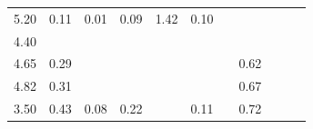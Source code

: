 \documentclass[10pt,a4paper]{article}
\begin{document}
\begin{table}
\begin{tabular}{@{}ccccccccccc@{}}
		5.20                                                         & 0.11                                                & 0.01                                                & 0.09                                                & 1.42                                                & 0.10                                                 &                                                     &                                                       &                                                         &                                                      & \cite{Walsh}         \\
		4.40                                                         &                                                     &                                                     &                                                     &                                                     &                                                      &                                                     &                                                       &                                                         &                                                      & \cite{Zheng}                                 \\
		4.65                                                         & 0.29                                                &                                                     &                                                     &                                                     &                                                      &                                                     & 0.62                                                  &                                                         &                                                      & \cite{Sorensen}                                           \\
		4.82                                                         & 0.31                                                &                                                     &                                                     &                                                     &                                                      &                                                     & 0.67                                                  &                                                         &                                                      & \cite{Sorensen}                                           \\
		3.50                                                         & 0.43                                                & 0.08                                                & 0.22                                                &                                                     & 0.11                                                 &                                                     & 0.72                                                  &                                                         &                                                      & \cite{Tampere}                                                        \\

\end{tabular}
\end{table}
\end{document}
